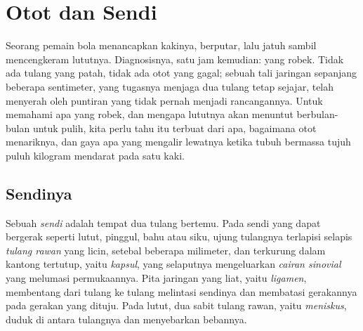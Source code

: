 \chapter{Otot dan Sendi}\label{ch:g10:muscles-and-joints}

Seorang pemain bola menancapkan kakinya, berputar, lalu jatuh sambil
mencengkeram lututnya. Diagnosisnya, satu jam kemudian:  yang
robek. Tidak ada tulang yang patah, tidak ada otot yang gagal; sebuah
tali jaringan sepanjang beberapa sentimeter, yang tugasnya menjaga dua
tulang tetap sejajar, telah menyerah oleh puntiran yang tidak pernah
menjadi rancangannya. Untuk memahami apa yang robek, dan mengapa
lututnya akan menuntut berbulan-bulan untuk pulih, kita perlu tahu
 itu terbuat dari apa, bagaimana otot menariknya, dan gaya apa
yang mengalir lewatnya ketika tubuh bermassa tujuh puluh kilogram
mendarat pada satu kaki.

\section{Sendinya}

\begin{definition}[Sendi]\label{def:g10:muscles-and-joints:joint}
Sebuah \emph{sendi} adalah tempat dua tulang bertemu. Pada
sendi yang dapat bergerak seperti lutut, pinggul, bahu atau siku, ujung
tulangnya terlapisi selapis \emph{tulang rawan}
yang licin, setebal beberapa milimeter, dan terkurung dalam kantong
tertutup, yaitu \emph{kapsul}, yang selaputnya mengeluarkan
\emph{cairan sinovial} yang melumasi permukaannya. Pita jaringan yang
liat, yaitu \emph{ligamen}, membentang dari tulang ke
tulang melintasi sendinya dan membatasi gerakannya pada gerakan yang
dituju. Pada lutut, dua sabit tulang rawan, yaitu \emph{meniskus},
duduk di antara tulangnya dan menyebarkan bebannya.
\end{definition}


